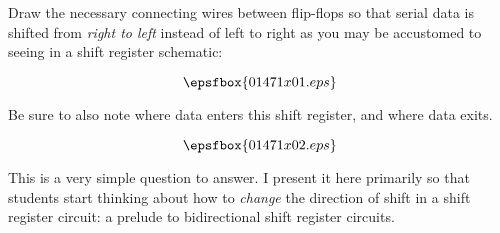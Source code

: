 

Draw the necessary connecting wires between flip-flops so that serial data is shifted from {\it right to left} instead of left to right as you may be accustomed to seeing in a shift register schematic:

$$\epsfbox{01471x01.eps}$$

Be sure to also note where data enters this shift register, and where data exits.







$$\epsfbox{01471x02.eps}$$







This is a very simple question to answer.  I present it here primarily so that students start thinking about how to {\it change} the direction of shift in a shift register circuit: a prelude to bidirectional shift register circuits.




